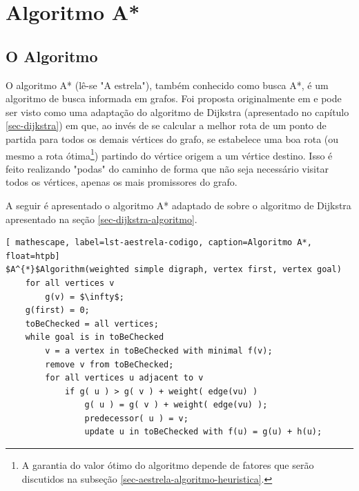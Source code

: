 \chapter{Algoritmo A*}
\label{sec-aestrela}

\section{O Algoritmo}
\label{sec-aestrela-algoritmo}
O algoritmo A* (lê-se "A estrela"), também conhecido como busca A*, é um algoritmo de busca informada em grafos. Foi proposta originalmente em  e pode ser visto como uma adaptação do algoritmo de Dijkstra (apresentado no capítulo \ref{sec-dijkstra}) em que, ao invés de se calcular a melhor rota de um ponto de partida para todos os demais vértices do grafo, se estabelece uma boa rota (ou mesmo a rota ótima\footnote{A garantia do valor ótimo do algoritmo depende de fatores que serão discutidos na subseção \ref{sec-aestrela-algoritmo-heuristica}.}) partindo do vértice origem a um vértice destino. Isso é feito realizando "podas" do caminho de forma que não seja necessário visitar todos os vértices, apenas os mais promissores do grafo.

A seguir é apresentado o algoritmo A* adaptado de  sobre o algoritmo de Dijkstra apresentado na seção \ref{sec-dijkstra-algoritmo}. 

\begin{lstlisting}[ mathescape, label=lst-aestrela-codigo, caption=Algoritmo A*, float=htpb]
$A^{*}$Algorithm(weighted simple digraph, vertex first, vertex goal)
	for all vertices v
		g(v) = $\infty$;
	g(first) = 0;
	toBeChecked = all vertices;
	while goal is in toBeChecked
		v = a vertex in toBeChecked with minimal f(v);
		remove v from toBeChecked;
		for all vertices u adjacent to v
			if g( u ) > g( v ) + weight( edge(vu) )
				g( u ) = g( v ) + weight( edge(vu) );
				predecessor( u ) = v;
				update u in toBeChecked with f(u) = g(u) + h(u);
\end{lstlisting}

